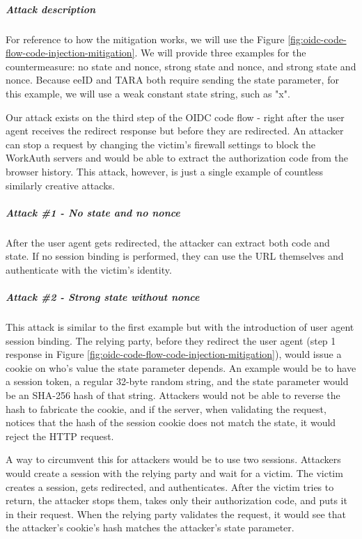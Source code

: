 \subparagraph{Attack description}

For reference to how the mitigation works, we will use the Figure \ref{fig:oidc-code-flow-code-injection-mitigation}. We will provide three examples for the countermeasure: no state and nonce, strong state and nonce, and strong state and nonce. Because eeID and TARA both require sending the {state} parameter, for this example, we will use a weak constant state string, such as "x".

Our attack exists on the third step of the OIDC code flow - right after the user agent receives the redirect response but before they are redirected. An attacker can stop a request by changing the victim's firewall settings to block the WorkAuth servers and would be able to extract the authorization code from the browser history. This attack, however, is just a single example of countless similarly creative attacks.

\subparagraph{Attack \#1 - No state and no nonce}

After the user agent gets redirected, the attacker can extract both code and state. If no session binding is performed, they can use the URL themselves and authenticate with the victim's identity.

\subparagraph{Attack \#2 - Strong state without nonce}

This attack is similar to the first example but with the introduction of user agent session binding. The relying party, before they redirect the user agent (step 1 response in Figure \ref{fig:oidc-code-flow-code-injection-mitigation}), would issue a cookie on who's value the state parameter depends. An example would be to have a session token, a regular 32-byte random string, and the state parameter would be an {SHA-256} hash of that string. Attackers would not be able to reverse the hash to fabricate the cookie, and if the server, when validating the request, notices that the hash of the session cookie does not match the state, it would reject the HTTP request.

A way to circumvent this for attackers would be to use two sessions. Attackers would create a session with the relying party and wait for a victim. The victim creates a session, gets redirected, and authenticates. After the victim tries to return, the attacker stops them, takes only their authorization code, and puts it in their request. When the relying party validates the request, it would see that the attacker's cookie's hash matches the attacker's state parameter.

